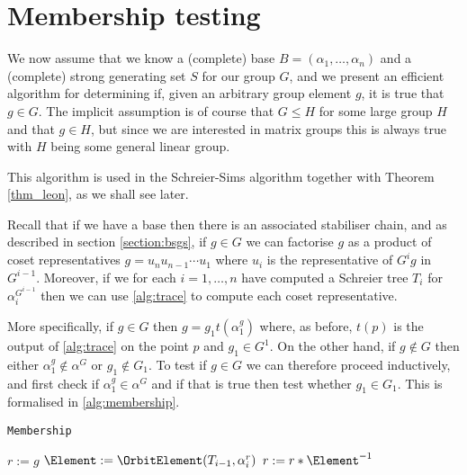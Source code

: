 \section{Membership testing}
We now assume that we know a (complete) base $B = (\alpha_1, \dotsc,
\alpha_n)$ and a (complete) strong generating set $S$ for our group
$G$, and we present an efficient algorithm for determining if, given
an arbitrary group element $g$, it is true that $g \in G$. The
implicit assumption is of course that $G \leq H$ for some large group
$H$ and that $g \in H$, but since we are interested in matrix groups
this is always true with $H$ being some general linear group.

This algorithm is used in the Schreier-Sims algorithm together with
Theorem \ref{thm_leon}, as we shall see later. 

Recall that if we have a base then there is an associated stabiliser
chain, and as described in section \ref{section:bsgs}, if $g \in G$ we
can factorise $g$ as a product of coset representatives $g = u_n u_{n - 1}
\dotsm u_1$ where $u_i$ is the representative of $G^i g$ in $G^{i -
  1}$. Moreover, if we for each $i = 1, \dotsc, n$ have computed a
Schreier tree $T_i$ for $\alpha_i^{G^{i - 1}}$ then we can use
\ref{alg:trace} to compute each coset representative.

More specifically, if $g \in G$ then $g = g_1 t(\alpha_1^g)$ where, as
before, $t(p)$ is the output of \ref{alg:trace} on the point $p$ and
$g_1 \in G^1$. On the other hand, if $g \notin G$ then either
$\alpha_1^g \notin \alpha^G$ or $g_1 \notin G_1$. To test if $g \in G$
we can therefore proceed inductively, and first check if $\alpha_1^g
\in \alpha^G$ and if that is true then test whether $g_1 \in G_1$.
This is formalised in \ref{alg:membership}.

\begin{algorithm} 
\dontprintsemicolon
\caption{\texttt{Membership}}
\Begin
{
  $r := g$ \;
  {
    {
    }
    $\Element := \OrbitElement(T_{i - 1}, \alpha_i^r)$ \;
    $r := r * \Element^{-1}$ \;
  }
   \label{alg:membership_return}
}
\label{alg:membership}
\end{algorithm}

